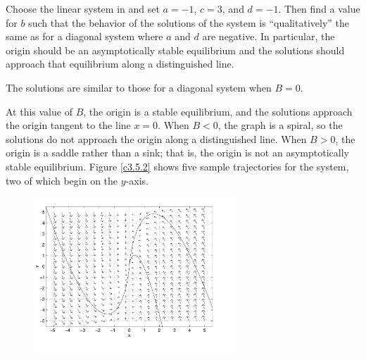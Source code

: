 \documentclass{ximera}
\begin{document}
\begin{computerExercise} \label{c3.5.2}
Choose the {\sf linear system} in {\pplane} and set
$a=-1$, $c=3$, and $d=-1$.
Then find a value for $b$ such that the behavior of the
solutions of the system is ``qualitatively'' the same as for a
diagonal system where $a$ and $d$ are negative.  In particular,
the origin should be an asymptotically stable equilibrium and
the solutions should approach that equilibrium along a
distinguished line.

\begin{solution}

\ans The solutions are similar to those for a diagonal system when
$B = 0$.

\soln At this value of $B$, the origin is a stable equilibrium, and the
solutions approach the origin tangent to the line $x = 0$.  When $B < 0$,
the graph is a spiral, so the solutions do not approach the origin along
a distinguished line.  When $B > 0$, the origin is a saddle rather
than a sink; that is, the origin is not an asymptotically stable
equilibrium.  Figure \ref{c3.5.2} shows five sample trajectories
for the system, two of which begin on the $y$-axis.

\begin{figure}[htb]
                       \centerline{%
                       \includegraphics[width=3.0in]{exfigure/3-5-2.pdf}}
\end{figure}

\end{solution}
\end{computerExercise}
\end{document}
